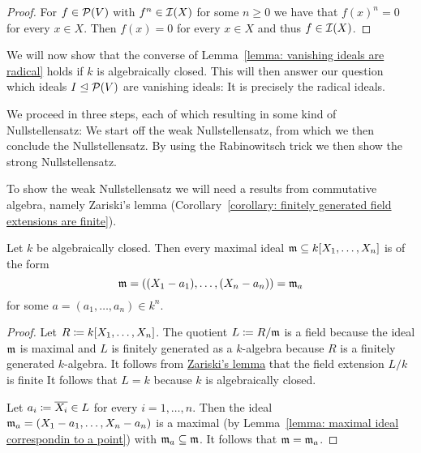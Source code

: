 \begin{proof}
  For $f \in \mathcal{P}(V)$ with $f^n \in \mathcal{I}(X)$ for some $n \geq 0$ we have that $f(x)^n = 0$ for every $x \in X$.
  Then $f(x) = 0$ for every $x \in X$ and thus $f \in \mathcal{I}(X)$.
\end{proof}


\begin{fluff}
  We will now show that the converse of Lemma~\ref{lemma: vanishing ideals are radical} holds if $k$ is algebraically closed.
  This will then answer our question which ideals $I \trianglelefteq \mathcal{P}(V)$ are vanishing ideals:
  It is precisely the radical ideals.
  
  We proceed in three steps, each of which resulting in some kind of Nullstellensatz:
  We start off the weak Nullstellensatz, from which we then conclude the Nullstellensatz.
  By using the Rabinowitsch trick we then show the strong Nullstellensatz.
  
  To show the weak Nullstellensatz we will need a results from commutative algebra, namely Zariski’s lemma (Corollary~\ref{corollary: finitely generated field extensions are finite}).
\end{fluff}


\begin{theorem}
  \label{theorem: weak nullstellensatz}
  Let $k$ be algebraically closed.
  Then every maximal ideal $\mathfrak{m} \subseteq k[X_1, \dotsc, X_n]$ is of the form
  \[
      \mathfrak{m}
    = ( (X_1 - a_1), \dotsc, (X_n - a_n) )
    = \mathfrak{m}_a
  \]
  for some $a = (a_1, \dotsc, a_n) \in k^n$.
\end{theorem}


\begin{proof}
  Let $R \coloneqq k[X_1, \dotsc, X_n]$.
  The quotient $L \coloneqq R/\mathfrak{m}$ is a field because the ideal $\mathfrak{m}$ is maximal and $L$ is finitely generated as a $k$-algebra because $R$ is a finitely generated $k$-algebra.
  It follows from \hyperref[corollary: finitely generated field extensions are finite]{Zariski’s lemma} that the field extension $L/k$ is finite
  It follows that $L = k$ because $k$ is algebraically closed.
  
  Let $a_i \coloneqq \overline{X_i} \in L$ for every $i = 1, \dotsc, n$.
  Then the ideal $\mathfrak{m}_a = (X_1 - a_1, \dotsc, X_n - a_n)$ is a maximal (by Lemma~\ref{lemma: maximal ideal correspondin to a point}) with $\mathfrak{m}_a \subseteq \mathfrak{m}$.
  It follows that $\mathfrak{m} = \mathfrak{m}_a$.
\end{proof}


